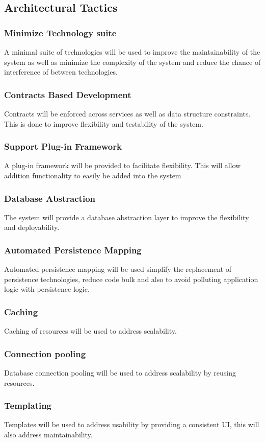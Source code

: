 \subsection{Architectural Tactics}
\subsubsection{Minimize Technology suite}
	A minimal suite of technologies will be used to improve the maintainability of the system as well as minimize the complexity of the system and reduce the chance of interference of between technologies.
\subsubsection{Contracts Based Development}
	Contracts will be enforced across services as well as data structure constraints. This is done to improve flexibility and testability of the system.
\subsubsection{Support Plug-in Framework}
	A plug-in framework will be provided to facilitate flexibility. This will allow addition functionality to easily be added into the system
\subsubsection{Database Abstraction}
	The system will provide a database abstraction layer to improve the flexibility and deployability.
\subsubsection{Automated Persistence Mapping}
	Automated persistence mapping will be used simplify the replacement of persistence technologies, reduce code bulk and also to avoid polluting application logic with persistence logic.
\subsubsection{Caching}
	Caching of resources will be used to address scalability.
\subsubsection{Connection pooling}
	Database connection pooling will be used to address scalability by reusing resources.
\subsubsection{Templating}
	Templates will be used to address usability by providing a consistent UI, this will also address maintainability.
